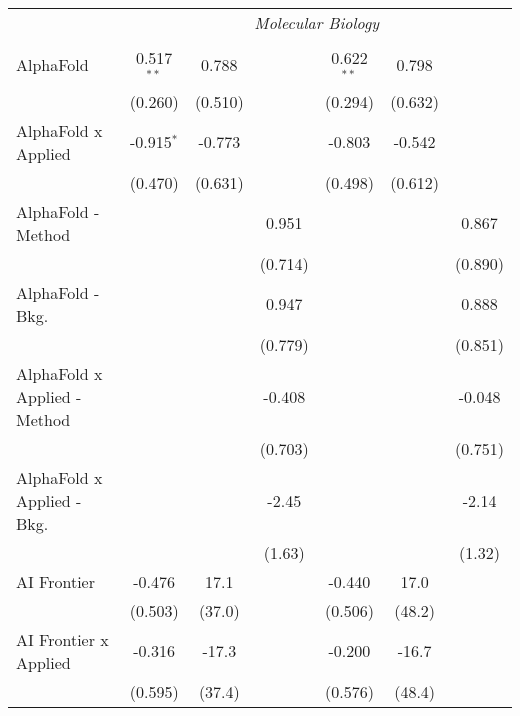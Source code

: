 \begin{tabular}{lcccccc}
 & \multicolumn{6}{c}{\textit{Molecular Biology}} \\ \\
   AlphaFold                      & 0.517$^{**}$ & 0.788   &               & 0.622$^{**}$ & 0.798        &   \\   
                                  & (0.260)      & (0.510) &               & (0.294)      & (0.632)      &   \\   
   AlphaFold x Applied            & -0.915$^{*}$ & -0.773  &               & -0.803       & -0.542       &   \\   
                                  & (0.470)      & (0.631) &               & (0.498)      & (0.612)      &   \\   
   AlphaFold - Method             &              &         & 0.951         &              &              & 0.867\\   
                                  &              &         & (0.714)       &              &              & (0.890)\\   
   AlphaFold - Bkg.               &              &         & 0.947         &              &              & 0.888\\   
                                  &              &         & (0.779)       &              &              & (0.851)\\   
   AlphaFold x Applied - Method   &              &         & -0.408        &              &              & -0.048\\   
                                  &              &         & (0.703)       &              &              & (0.751)\\   
   AlphaFold x Applied - Bkg.     &              &         & -2.45         &              &              & -2.14\\   
                                  &              &         & (1.63)        &              &              & (1.32)\\   
   AI Frontier                    & -0.476       & 17.1    &               & -0.440       & 17.0         &   \\   
                                  & (0.503)      & (37.0)  &               & (0.506)      & (48.2)       &   \\   
   AI Frontier x Applied          & -0.316       & -17.3   &               & -0.200       & -16.7        &   \\   
                                  & (0.595)      & (37.4)  &               & (0.576)      & (48.4)       &   \\   

\end{tabular}

